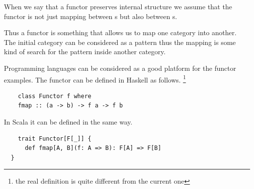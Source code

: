 \begin{remark}[Functor]
  When we say that a functor preserves internal structure we assume that
  the functor is not just mapping between s but
  also between s.  

  Thus a functor is something that allows us to map one category into another.
  The initial category can be considered as a pattern thus the mapping
  is some kind of search for the pattern inside another category.
\end{remark}

Programming languages can be considered as a good platform for the
functor examples. 
The functor can be defined in Haskell as follows.
\footnote{the real definition is quite different from the current one}
\begin{example}
  \label{ex:functor_haskell}
  \begin{verbatim}
    class Functor f where
    fmap :: (a -> b) -> f a -> f b
  \end{verbatim} 
\end{example}

In Scala it can be defined in the same way.
\begin{example}
  \label{ex:functor_scala}
  \begin{verbatim}
    trait Functor[F[_]] {
      def fmap[A, B](f: A => B): F[A] => F[B]
  }\end{verbatim} 
\end{example}

